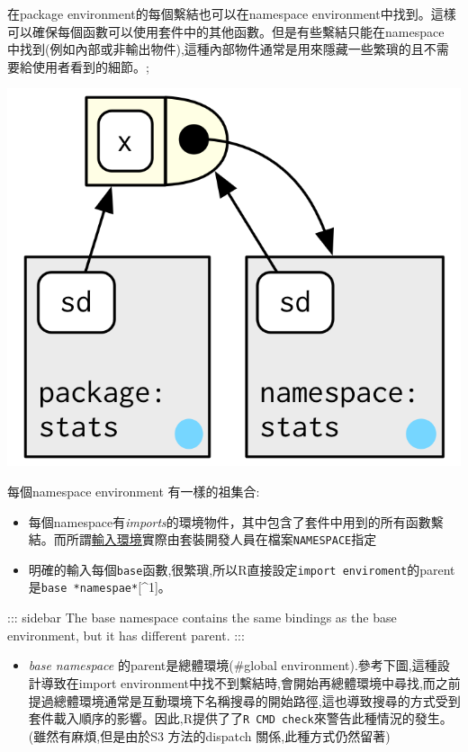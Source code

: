 \documentclass[]{book}
\providecommand{\tightlist}{%
  \setlength{\itemsep}{0pt}\setlength{\parskip}{0pt}}
\theoremstyle{definition}
\theoremstyle{definition}
\theoremstyle{definition}
\theoremstyle{remark}
\begin{document}
在package environment的每個繫結也可以在namespace
environment中找到。這樣可以確保每個函數可以使用套件中的其他函數。但是有些繫結只能在namespace
中找到(例如內部或非輸出物件),這種內部物件通常是用來隱藏一些繁瑣的且不需要給使用者看到的細節。;

\begin{center}\includegraphics{diagrams/environments/namespace-bind} \end{center}

每個namespace environment 有一樣的祖集合:

\begin{itemize}
\item
  每個namespace有\emph{imports}的環境物件，其中包含了套件中用到的所有函數繫結。而所謂\protect\hyperlink{imports-environment}{輸入環境}實際由套裝開發人員在檔案\texttt{NAMESPACE}指定
\item
  明確的輸入每個\texttt{base}函數,很繁瑣,所以R直接設定\texttt{import\ enviroment}的parent是\texttt{base\ *namespae*}{[}\^{}1{]}。
\end{itemize}

::: sidebar The base namespace contains the same bindings as the base
environment, but it has different parent. :::

\begin{itemize}
\tightlist
\item
  \emph{base namespace} 的parent是總體環境(\#global
  environment).參考下圖,這種設計導致在import
  environment中找不到繫結時,會開始再總體環境中尋找,而之前提過總體環境通常是互動環境下名稱搜尋的開始路徑,這也導致搜尋的方式受到套件載入順序的影響。因此,R提供了了\texttt{R\ CMD\ check}來警告此種情況的發生。(雖然有麻煩,但是由於S3
  方法的dispatch 關係,此種方式仍然留著)
\end{itemize}
\end{document}

